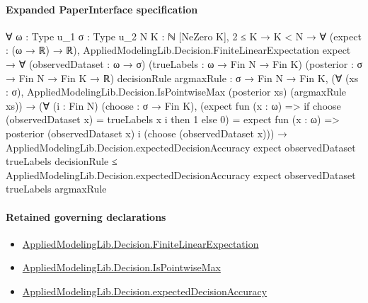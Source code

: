 \documentclass[10pt]{article}
\begin{document}
\paragraph{Expanded PaperInterface specification}
\begin{ReviewVerbatim}
∀ {ω : Type u_1} {σ : Type u_2} {N K : ℕ} [NeZero K],
  2 ≤ K →
    K < N →
      ∀ (expect : (ω → ℝ) → ℝ),
        AppliedModelingLib.Decision.FiniteLinearExpectation expect →
          ∀ (observedDataset : ω → σ) (trueLabels : ω → Fin N → Fin K) (posterior : σ → Fin N → Fin K → ℝ)
            {decisionRule argmaxRule : σ → Fin N → Fin K},
            (∀ (xs : σ), AppliedModelingLib.Decision.IsPointwiseMax (posterior xs) (argmaxRule xs)) →
              (∀ (i : Fin N) (choose : σ → Fin K),
                  (expect fun (x : ω) => if choose (observedDataset x) = trueLabels x i then 1 else 0) =
                    expect fun (x : ω) => posterior (observedDataset x) i (choose (observedDataset x))) →
                AppliedModelingLib.Decision.expectedDecisionAccuracy expect observedDataset trueLabels decisionRule ≤
                  AppliedModelingLib.Decision.expectedDecisionAccuracy expect observedDataset trueLabels argmaxRule
\end{ReviewVerbatim}

\paragraph{Retained governing declarations}
\begin{itemize}\raggedright
\item \hyperlink{governing-declaration-443446486047239c}{Applied\allowbreak{}Modeling\allowbreak{}Lib.\allowbreak{}Decision.\allowbreak{}Finite\allowbreak{}Linear\allowbreak{}Expectation}
\item \hyperlink{governing-declaration-06698b1aac1f5804}{Applied\allowbreak{}Modeling\allowbreak{}Lib.\allowbreak{}Decision.\allowbreak{}Is\allowbreak{}Pointwise\allowbreak{}Max}
\item \hyperlink{governing-declaration-61110afe97ed1775}{Applied\allowbreak{}Modeling\allowbreak{}Lib.\allowbreak{}Decision.\allowbreak{}expected\allowbreak{}Decision\allowbreak{}Accuracy}
\end{itemize}
\end{document}
